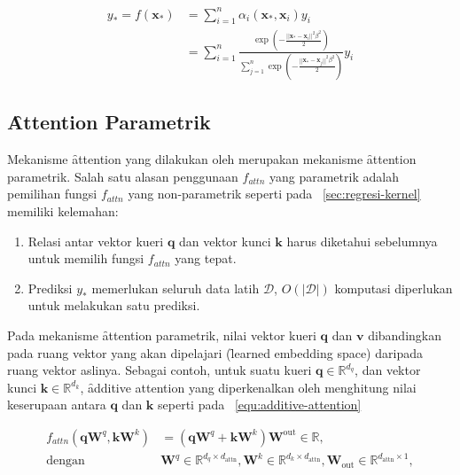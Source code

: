 	\begin{align}
		\label{equ:regresi-kernel-gaussian-start}
		y_{*} = f(\mathbf{x}_{*}) &= \sum_{i=1}^{n} \alpha_{i}(\mathbf{x}_{*},\mathbf{x}_i) y_i	\\
		&= \sum_{i=1}^{n} \frac{\exp\left(-\frac{||\mathbf{x}_{*}-\mathbf{x}_i||^2 \beta^2}{2}\right)}{\sum_{j=1}^{n} \exp\left(-\frac{||\mathbf{x}_{*}-\mathbf{x}_j||^2 \beta^2}{2}\right)} y_i
	\end{align}

	\subsection{\f{Attention} Parametrik}

	Mekanisme \f{attention} yang dilakukan oleh \cite{transformerori} merupakan mekanisme \f{attention} parametrik. Salah satu alasan penggunaan $f_{attn}$ yang parametrik adalah pemilihan fungsi $f_{attn}$ yang non-parametrik seperti pada \sect~\ref{sec:regresi-kernel} memiliki kelemahan:


	\begin{enumerate}
		\item Relasi antar vektor kueri $\mathbf{q}$ dan vektor kunci $\mathbf{k}$ harus diketahui sebelumnya untuk memilih fungsi $f_{attn}$ yang tepat.
		\item Prediksi $y_*$ memerlukan seluruh data latih $\mathcal{D}$, $O(|\mathcal{D}|)$ komputasi diperlukan untuk melakukan satu prediksi.
	\end{enumerate}

	

	Pada mekanisme \f{attention} parametrik, nilai vektor kueri $\mathbf{q}$ dan $\mathbf{v}$ dibandingkan pada ruang vektor yang akan dipelajari (\f{learned embedding space}) daripada ruang vektor aslinya. Sebagai contoh, untuk suatu kueri $\mathbf{q}\in \mathbb{R}^{d_q}$, dan vektor kunci $\mathbf{k} \in \mathbb{R}^{d_k}$, \f{additive attention} yang diperkenalkan oleh \cite{bahdanau2016neural} menghitung nilai keserupaan antara $\mathbf{q}$ dan $\mathbf{k}$ seperti pada \equ~\ref{equ:additive-attention}

	\begin{align}
	\label{equ:additive-attention}
	f_{attn}(\mathbf{q} \mathbf{W}^q, \mathbf{k} \mathbf{W}^k) &= (\mathbf{q} \mathbf{W}^q  + \mathbf{k} \mathbf{W}^k)  \mathbf{W}^{\text{out}} \in \mathbb{R}, \\
	\text{dengan } &\mathbf{W}^q \in \mathbb{R}^{d_q \times d_{\text{attn}}}, \mathbf{W}^k \in \mathbb{R}^{d_k \times d_{\text{attn}}}, \mathbf{W}_{\text{out}} \in \mathbb{R}^{d_{\text{attn}} \times 1},
	\end{align}

